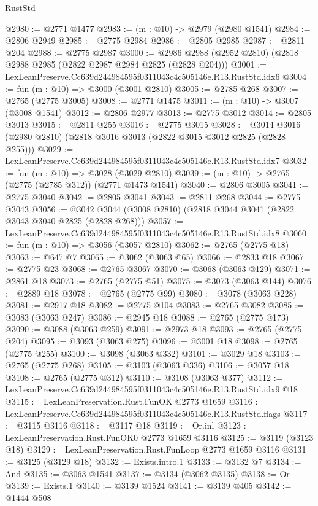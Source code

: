 \begin{lexlean}{RustStd}
\begin{coremodule}
@2980 := @2771 @1477
@2983 := (m : @10) -> @2979 (@2980 @1541)
@2984 := @2806 @2949
@2985 := @2775 @2984
@2986 := @2805 @2985
@2987 := @2811 @204
@2988 := @2775 @2987
@3000 := @2986 @2988 (@2952 @2810) (@2818 @2988 @2985 (@2822 @2987 @2984 @2825 (@2828 @204)))
@3001 := LexLeanPreserve.Cc639d244984595f0311043c4c505146e.R13.RustStd.idx6
@3004 := fun (m : @10) => @3000 (@3001 @2810)
@3005 := @2785 @268
@3007 := @2765 (@2775 @3005)
@3008 := @2771 @1475
@3011 := (m : @10) -> @3007 (@3008 @1541)
@3012 := @2806 @2977
@3013 := @2775 @3012
@3014 := @2805 @3013
@3015 := @2811 @255
@3016 := @2775 @3015
@3028 := @3014 @3016 (@2980 @2810) (@2818 @3016 @3013 (@2822 @3015 @3012 @2825 (@2828 @255)))
@3029 := LexLeanPreserve.Cc639d244984595f0311043c4c505146e.R13.RustStd.idx7
@3032 := fun (m : @10) => @3028 (@3029 @2810)
@3039 := (m : @10) -> @2765 (@2775 (@2785 @312)) (@2771 @1473 @1541)
@3040 := @2806 @3005
@3041 := @2775 @3040
@3042 := @2805 @3041
@3043 := @2811 @268
@3044 := @2775 @3043
@3056 := @3042 @3044 (@3008 @2810) (@2818 @3044 @3041 (@2822 @3043 @3040 @2825 (@2828 @268)))
@3057 := LexLeanPreserve.Cc639d244984595f0311043c4c505146e.R13.RustStd.idx8
@3060 := fun (m : @10) => @3056 (@3057 @2810)
@3062 := @2765 (@2775 @18)
@3063 := @647 @7
@3065 := @3062 (@3063 @65)
@3066 := @2833 @18
@3067 := @2775 @23
@3068 := @2765 @3067
@3070 := @3068 (@3063 @129)
@3071 := @2861 @18
@3073 := @2765 (@2775 @51)
@3075 := @3073 (@3063 @144)
@3076 := @2889 @18
@3078 := @2765 (@2775 @99)
@3080 := @3078 (@3063 @228)
@3081 := @2917 @18
@3082 := @2775 @104
@3083 := @2765 @3082
@3085 := @3083 (@3063 @247)
@3086 := @2945 @18
@3088 := @2765 (@2775 @173)
@3090 := @3088 (@3063 @259)
@3091 := @2973 @18
@3093 := @2765 (@2775 @204)
@3095 := @3093 (@3063 @275)
@3096 := @3001 @18
@3098 := @2765 (@2775 @255)
@3100 := @3098 (@3063 @332)
@3101 := @3029 @18
@3103 := @2765 (@2775 @268)
@3105 := @3103 (@3063 @336)
@3106 := @3057 @18
@3108 := @2765 (@2775 @312)
@3110 := @3108 (@3063 @377)
@3112 := LexLeanPreserve.Cc639d244984595f0311043c4c505146e.R13.RustStd.idx9 @18
@3115 := LexLeanPreservation.Rust.FunOK @2773 @1659
@3116 := LexLeanPreserve.Cc639d244984595f0311043c4c505146e.R13.RustStd.flags
@3117 := @3115 @3116
@3118 := @3117 @18
@3119 := Or.inl
@3123 := LexLeanPreservation.Rust.FunOK0 @2773 @1659 @3116
@3125 := @3119 (@3123 @18)
@3129 := LexLeanPreservation.Rust.FunLoop @2773 @1659 @3116
@3131 := @3125 (@3129 @18)
@3132 := Exists.intro.{1}
@3133 := @3132 @7
@3134 := And
@3135 := @3063 @1541
@3137 := @3134 (@3062 @3135)
@3138 := Or
@3139 := Exists.{1}
@3140 := @3139 @1524
@3141 := @3139 @405
@3142 := @1444 @508

\end{coremodule}
\end{lexlean}
